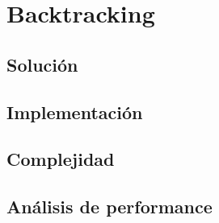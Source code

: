 \section{Backtracking}
\subsection{Solución}
\subsection{Implementación}
\subsection{Complejidad}
\subsection{Análisis de performance}